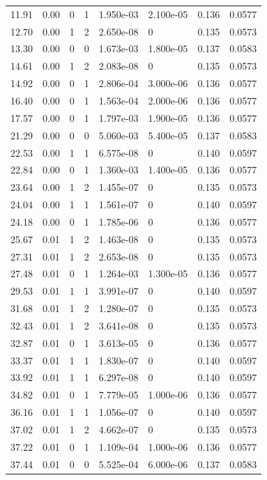 \documentclass[preview]{standalone}
\begin{document}
{{\begin{tabular}{L{1.2cm}C{1.2cm} C{0.3cm}C{0.5cm} C{1.4cm}C{1.4cm} C{1.4cm}C{1.4cm}}
  11.91  &  0.00  & 0     &  1 &  1.950e-03  & 2.100e-05  & 0.136 &  0.0577   \\ 
  12.70  &  0.00  & 1     &  2 &  2.650e-08  & 0  & 0.135 &  0.0573   \\ 
  13.30  &  0.00  & 0     &  0 &  1.673e-03  & 1.800e-05  & 0.137 &  0.0583   \\ 
  14.61  &  0.00  & 1     &  2 &  2.083e-08  & 0  & 0.135 &  0.0573   \\ 
  14.92  &  0.00  & 0     &  1 &  2.806e-04  & 3.000e-06  & 0.136 &  0.0577   \\ 
  16.40  &  0.00  & 0     &  1 &  1.563e-04  & 2.000e-06  & 0.136 &  0.0577   \\ 
  17.57  &  0.00  & 0     &  1 &  1.797e-03  & 1.900e-05  & 0.136 &  0.0577   \\ 
  21.29  &  0.00  & 0     &  0 &  5.060e-03  & 5.400e-05  & 0.137 &  0.0583   \\ 
  22.53  &  0.00  & 1     &  1 &  6.575e-08  & 0  & 0.140 &  0.0597   \\ 
  22.84  &  0.00  & 0     &  1 &  1.360e-03  & 1.400e-05  & 0.136 &  0.0577   \\ 
  23.64  &  0.00  & 1     &  2 &  1.455e-07  & 0  & 0.135 &  0.0573   \\ 
  24.04  &  0.00  & 1     &  1 &  1.561e-07  & 0  & 0.140 &  0.0597   \\ 
  24.18  &  0.00  & 0     &  1 &  1.785e-06  & 0  & 0.136 &  0.0577   \\ 
  25.67  &  0.01  & 1     &  2 &  1.463e-08  & 0  & 0.135 &  0.0573   \\ 
  27.31  &  0.01  & 1     &  2 &  2.653e-08  & 0  & 0.135 &  0.0573   \\ 
  27.48  &  0.01  & 0     &  1 &  1.264e-03  & 1.300e-05  & 0.136 &  0.0577   \\ 
  29.53  &  0.01  & 1     &  1 &  3.991e-07  & 0  & 0.140 &  0.0597   \\ 
  31.68  &  0.01  & 1     &  2 &  1.280e-07  & 0  & 0.135 &  0.0573   \\ 
  32.43  &  0.01  & 1     &  2 &  3.641e-08  & 0  & 0.135 &  0.0573   \\ 
  32.87  &  0.01  & 0     &  1 &  3.613e-05  & 0  & 0.136 &  0.0577   \\ 
  33.37  &  0.01  & 1     &  1 &  1.830e-07  & 0  & 0.140 &  0.0597   \\ 
  33.92  &  0.01  & 1     &  1 &  6.297e-08  & 0  & 0.140 &  0.0597   \\ 
  34.82  &  0.01  & 0     &  1 &  7.779e-05  & 1.000e-06  & 0.136 &  0.0577   \\ 
  36.16  &  0.01  & 1     &  1 &  1.056e-07  & 0  & 0.140 &  0.0597   \\ 
  37.02  &  0.01  & 1     &  2 &  4.662e-07  & 0  & 0.135 &  0.0573   \\ 
  37.22  &  0.01  & 0     &  1 &  1.109e-04  & 1.000e-06  & 0.136 &  0.0577   \\ 
  37.44  &  0.01  & 0     &  0 &  5.525e-04  & 6.000e-06  & 0.137 &  0.0583   \\ 
\hline 
\end{tabular} 

}}
\end{document}
